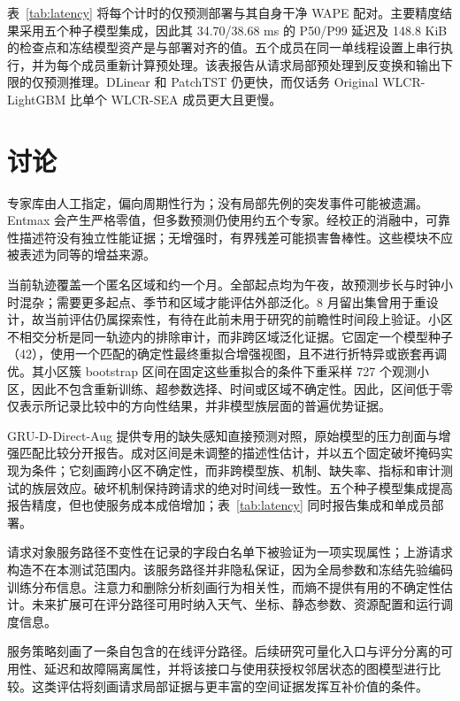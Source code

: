 \documentclass[10pt,conference,letterpaper]{IEEEtran}
\newcommand{\method}{WLCR-SEA}
\newcommand{\originalmethod}{Original WLCR-LightGBM}
\begin{document}
表~\ref{tab:latency} 将每个计时的仅预测部署与其自身干净 WAPE 配对。主要精度结果采用五个种子模型集成，因此其 34.70/38.68 ms 的 P50/P99 延迟及 148.8 KiB 的检查点和冻结模型资产是与部署对齐的值。五个成员在同一单线程设置上串行执行，并为每个成员重新计算预处理。该表报告从请求局部预处理到反变换和输出下限的仅预测推理。DLinear 和 PatchTST 仍更快，而仅话务 \originalmethod{} 比单个 \method{} 成员更大且更慢。



\section{讨论}\label{sec:discussion}
专家库由人工指定，偏向周期性行为；没有局部先例的突发事件可能被遗漏。Entmax 会产生严格零值，但多数预测仍使用约五个专家。经校正的消融中，可靠性描述符没有独立性能证据；无增强时，有界残差可能损害鲁棒性。这些模块不应被表述为同等的增益来源。

当前轨迹覆盖一个匿名区域和约一个月。全部起点均为午夜，故预测步长与时钟小时混杂；需要更多起点、季节和区域才能评估外部泛化。8 月留出集曾用于重设计，故当前评估仍属探索性，有待在此前未用于研究的前瞻性时间段上验证。小区不相交分析是同一轨迹内的排除审计，而非跨区域泛化证据。它固定一个模型种子（42），使用一个匹配的确定性最终重拟合增强视图，且不进行折特异或嵌套再调优。其小区簇 bootstrap 区间在固定这些重拟合的条件下重采样 727 个观测小区，因此不包含重新训练、超参数选择、时间或区域不确定性。因此，区间低于零仅表示所记录比较中的方向性结果，并非模型族层面的普遍优势证据。

GRU-D-Direct-Aug 提供专用的缺失感知直接预测对照，原始模型的压力剖面与增强匹配比较分开报告。成对区间是未调整的描述性估计，并以五个固定破坏掩码实现为条件；它刻画跨小区不确定性，而非跨模型族、机制、缺失率、指标和审计测试的族层效应。破坏机制保持跨请求的绝对时间线一致性。五个种子模型集成提高报告精度，但也使服务成本成倍增加；表~\ref{tab:latency} 同时报告集成和单成员部署。

请求对象服务路径不变性在记录的字段白名单下被验证为一项实现属性；上游请求构造不在本测试范围内。该服务路径并非隐私保证，因为全局参数和冻结先验编码训练分布信息。注意力和删除分析刻画行为相关性，而熵不提供有用的不确定性估计。未来扩展可在评分路径可用时纳入天气、坐标、静态参数、资源配置和运行调度信息。

服务策略刻画了一条自包含的在线评分路径。后续研究可量化入口与评分分离的可用性、延迟和故障隔离属性，并将该接口与使用获授权邻居状态的图模型进行比较。这类评估将刻画请求局部证据与更丰富的空间证据发挥互补价值的条件。
\end{document}
